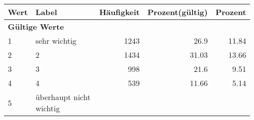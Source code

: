      \begin{longtable}{lXrrr}
     \toprule
     \textbf{Wert} & \textbf{Label} & \textbf{Häufigkeit} & \textbf{Prozent(gültig)} & \textbf{Prozent} \\
     \endhead
     \midrule
     \multicolumn{5}{l}{\textbf{Gültige Werte}}\\

     1 &
     \multicolumn{1}{X}{ sehr wichtig   } &


       \num{1243} &
       \num[round-mode=places,round-precision=2]{26,9} &
         \num[round-mode=places,round-precision=2]{11,84} \\

     2 &
     \multicolumn{1}{X}{ 2   } &


       \num{1434} &
       \num[round-mode=places,round-precision=2]{31,03} &
         \num[round-mode=places,round-precision=2]{13,66} \\

     3 &
     \multicolumn{1}{X}{ 3   } &


       \num{998} &
       \num[round-mode=places,round-precision=2]{21,6} &
         \num[round-mode=places,round-precision=2]{9,51} \\

     4 &
     \multicolumn{1}{X}{ 4   } &


       \num{539} &
       \num[round-mode=places,round-precision=2]{11,66} &
         \num[round-mode=places,round-precision=2]{5,14} \\

     5 &
     \multicolumn{1}{X}{ überhaupt nicht wichtig   } &



\end{longtable}
